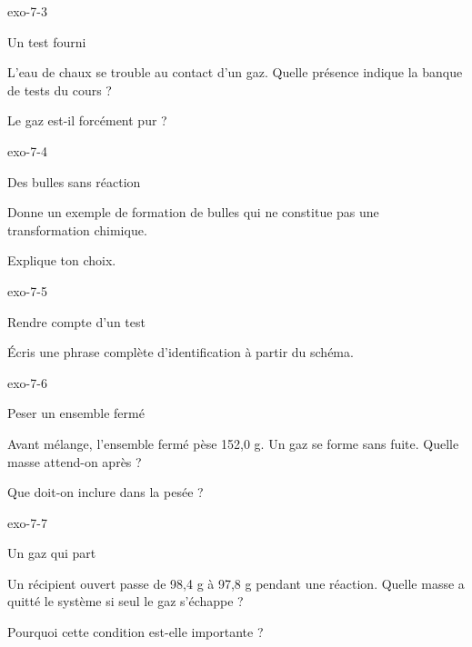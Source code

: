 \documentclass[12pt,twoside,openany]{book}
\begin{document}
\begin{blocLivre}{exo-7-3}
\begin{exercice}[1]{Un test fourni}
\begin{questions}
\item L’eau de chaux se trouble au contact d’un gaz. Quelle présence indique la banque de tests du cours ?
\item Le gaz est-il forcément pur ?
\end{questions}
\end{exercice}\end{blocLivre}
\begin{blocLivre}{exo-7-4}
\begin{exercice}[1]{Des bulles sans réaction}
\begin{questions}
\item Donne un exemple de formation de bulles qui ne constitue pas une transformation chimique.
\item Explique ton choix.
\end{questions}
\end{exercice}\end{blocLivre}
\begin{blocLivre}{exo-7-5}
\begin{exercice}[1]{Rendre compte d’un test}
\begin{questions}
\item Écris une phrase complète d’identification à partir du schéma.
\end{questions}
\end{exercice}\end{blocLivre}
\begin{blocLivre}{exo-7-6}
\begin{exercice}[2]{Peser un ensemble fermé}
\begin{questions}
\item Avant mélange, l’ensemble fermé pèse 152,0 g. Un gaz se forme sans fuite. Quelle masse attend-on après ?
\item Que doit-on inclure dans la pesée ?
\end{questions}
\end{exercice}\end{blocLivre}
\begin{blocLivre}{exo-7-7}
\begin{exercice}[2]{Un gaz qui part}
\begin{questions}
\item Un récipient ouvert passe de 98,4 g à 97,8 g pendant une réaction. Quelle masse a quitté le système si seul le gaz s’échappe ?
\item Pourquoi cette condition est-elle importante ?
\end{questions}
\end{exercice}\end{blocLivre}
\end{document}
